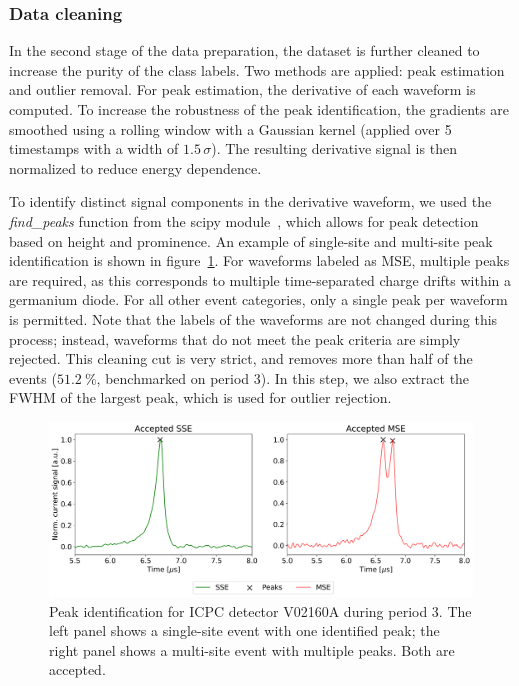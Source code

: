 \subsubsection{Data cleaning}

In the second stage of the data preparation, the dataset is further cleaned to increase the purity of the class labels. Two methods are applied: peak estimation and outlier removal. 
For peak estimation, the derivative of each waveform is computed. To increase the robustness of the peak identification, the gradients are smoothed using a rolling window with a Gaussian kernel (applied over 5 timestamps with a width of $1.5 \,\sigma$). The resulting derivative signal is then normalized to reduce energy dependence. 



To identify distinct signal components in the derivative waveform, we used the \textit{find\_peaks} function from the scipy module~\cite{virtanen_scipy_2020}, which allows for peak detection based on height and prominence. An example of single-site and multi-site peak identification is shown in figure~\ref{fig:datacleaning_PeakID}. 
For waveforms labeled as MSE, multiple peaks are required, as this corresponds to multiple time-separated charge drifts within a germanium diode. For all other event categories, only a single peak per waveform is permitted. 
Note that the labels of the waveforms are not changed during this process; instead, waveforms that do not meet the peak criteria are simply rejected. This cleaning cut is very strict, and removes more than half of the events ($51.2~\%$, benchmarked on period 3). In this step, we also extract the FWHM of the largest peak, which is used for outlier rejection.

\begin{figure}[t]
    \centering
    \includegraphics[width=\linewidth]{figures/05_PSD/Plot_DataCleaning_PeakID_V02160A.png}
    \caption{Peak identification for ICPC detector V02160A during period 3. The left panel shows a single-site event with one identified peak; the right panel shows a multi-site event with multiple peaks. Both are accepted.}
\label{fig:datacleaning_PeakID}
\end{figure}

